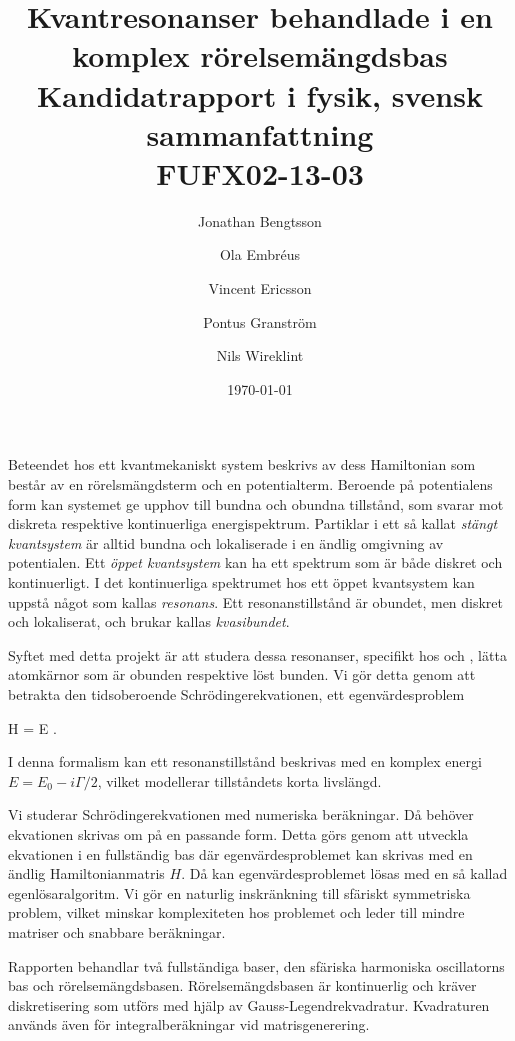 \documentclass[12pt,a4paper]{article}
\begin{document}
  


\title{Kvantresonanser behandlade i en\\ komplex rörelsemängdsbas \\ 
\Large Kandidatrapport i fysik, svensk sammanfattning\\
FUFX02-13-03}
\author{Jonathan Bengtsson \and Ola Embréus \and Vincent Ericsson \and Pontus Granström \and Nils Wireklint}
\date{\today}
\maketitle
\newpage

Beteendet hos ett kvantmekaniskt system beskrivs av dess Hamiltonian som består av en rörelsmängdsterm och en potentialterm.
Beroende på potentialens form kan systemet ge upphov till bundna och obundna tillstånd, som svarar mot diskreta respektive kontinuerliga energispektrum.
Partiklar i ett så kallat \emph{stängt kvantsystem} är alltid bundna och lokaliserade i en ändlig omgivning av potentialen. 
Ett \emph{öppet kvantsystem} kan ha ett spektrum som är både diskret och kontinuerligt.
I det kontinuerliga spektrumet hos ett öppet kvantsystem kan uppstå något som kallas \emph{resonans}.
Ett resonanstillstånd är obundet, men diskret och lokaliserat, och brukar kallas \emph{kvasibundet}.

Syftet med detta projekt är att studera dessa resonanser, specifikt hos  och , lätta atomkärnor som är obunden respektive löst bunden.
Vi gör detta genom att betrakta den tidsoberoende Schrödingerekvationen, ett egenvärdesproblem
\begin{eq*}
  H \ket\psi = E \ket\psi.
\end{eq*}
I denna formalism kan ett resonanstillstånd beskrivas med en komplex energi $E = E_0 - i\Gamma/2$, vilket modellerar tillståndets korta livslängd.

Vi studerar Schrödingerekvationen med numeriska beräkningar. Då behöver ekvationen skrivas om på en passande form.
Detta görs genom att utveckla ekvationen i en fullständig bas där egenvärdesproblemet kan skrivas med en ändlig Hamiltonianmatris $H$. 
Då kan egenvärdesproblemet lösas med en så kallad egenlösaralgoritm.
Vi gör en naturlig inskränkning till sfäriskt symmetriska problem, vilket minskar komplexiteten hos problemet och leder till mindre matriser och snabbare beräkningar.

Rapporten behandlar två fullständiga baser, den sfäriska harmoniska oscillatorns bas och rörelsemängdsbasen. 
Rörelsemängdsbasen är kontinuerlig och kräver diskretisering som utförs med hjälp av Gauss-Legendrekvadratur. Kvadraturen används även för integralberäkningar vid matrisgenerering.
\end{document}
